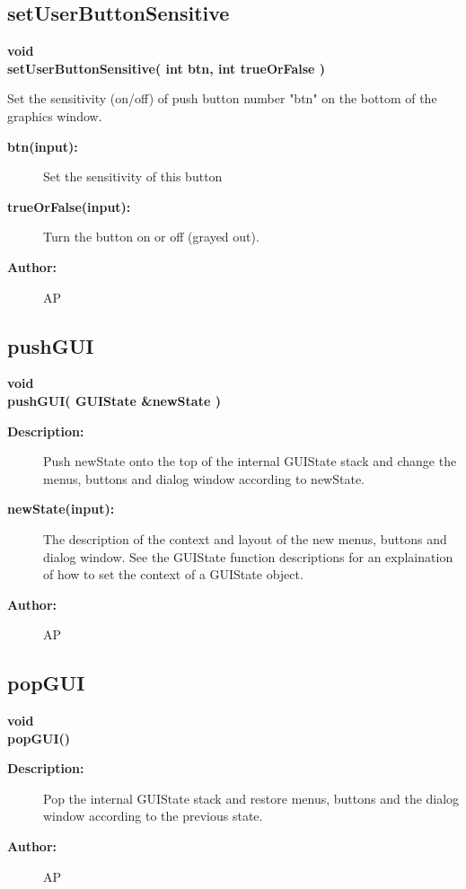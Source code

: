 \subsection{setUserButtonSensitive}
 
\begin{flushleft} \textbf{%
void  \\ 
\settowidth{\GLGraphicsInterfaceIncludeArgIndent}{setUserButtonSensitive(}%
setUserButtonSensitive( int btn, int trueOrFalse )
}\end{flushleft}
 Set the sensitivity (on/off) of push button number "btn" on the bottom of the graphics window.
\begin{description}
\item[{\bf btn(input):}]  Set the sensitivity of this button
\item[{\bf trueOrFalse(input):}]  Turn the button on or off (grayed out).
\item[{\bf Author:}]  AP
\end{description}
\subsection{pushGUI}
 
\begin{flushleft} \textbf{%
void  \\ 
\settowidth{\GLGraphicsInterfaceIncludeArgIndent}{pushGUI(}%
pushGUI( GUIState \&newState )
}\end{flushleft}
\begin{description}
\item[{\bf Description:}] 
 Push newState onto the top of the internal GUIState stack and change the menus, buttons 
 and dialog window according to newState.

\item[{\bf newState(input):}]  The description of the context and layout of the new menus, buttons 
 and dialog window. See the GUIState function descriptions for an explaination of how to
 set the context of a GUIState object.
\item[{\bf Author:}]  AP
\end{description}
\subsection{popGUI}
 
\begin{flushleft} \textbf{%
void  \\ 
\settowidth{\GLGraphicsInterfaceIncludeArgIndent}{popGUI(}%
popGUI()
}\end{flushleft}
\begin{description}
\item[{\bf Description:}] 
 Pop the internal GUIState stack and restore menus, buttons 
 and the dialog window according to the previous state.
\item[{\bf Author:}]  AP
\end{description}
